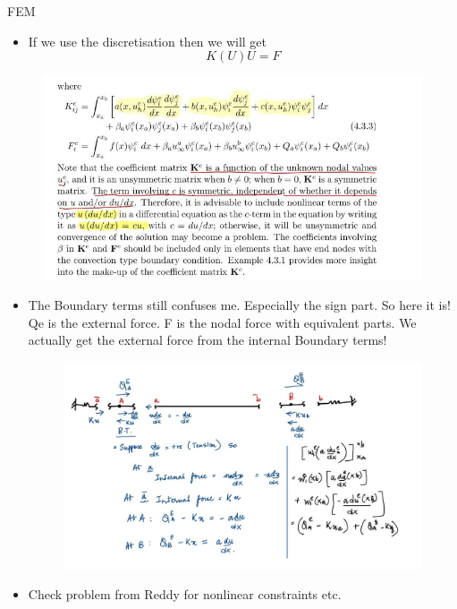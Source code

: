 	\begin{frame}{FEM}
		\begin{itemize}
			\item If we use the discretisation then we will get 
			\begin{equation}
			K(U)U = F
			\end{equation}
		\end{itemize} 
		\begin{figure}
		\centering
		\includegraphics[width=0.8\linewidth]{Figure/fig11} 
		\end{figure}
	\end{frame}


	\begin{frame}
		\begin{itemize}
			\item The Boundary terms still confuses me. Especially the sign part. So here it is! Qe is the external force. F is the nodal force with equivalent parts. We actually get the external force from the internal Boundary terms!
			\begin{figure}
				\centering
				\includegraphics[width=1\linewidth]{Figure/fig12} 
			\end{figure}
			\item Check problem from Reddy for nonlinear constraints etc.
		\end{itemize}
	\end{frame}



